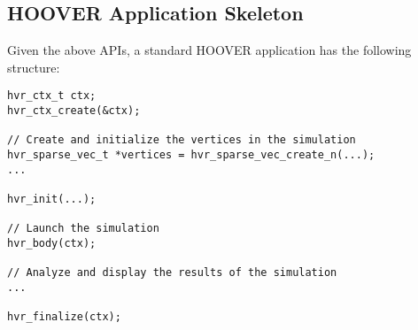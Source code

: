 \subsection{HOOVER Application Skeleton}

Given the above APIs, a standard HOOVER application has the following structure:

\begin{verbatim}
hvr_ctx_t ctx;
hvr_ctx_create(&ctx);

// Create and initialize the vertices in the simulation
hvr_sparse_vec_t *vertices = hvr_sparse_vec_create_n(...);
...

hvr_init(...);

// Launch the simulation
hvr_body(ctx);

// Analyze and display the results of the simulation
...

hvr_finalize(ctx);

\end{verbatim}
